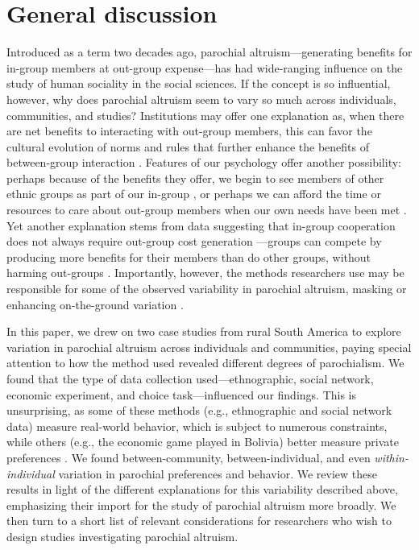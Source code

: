 \documentclass[bibauthoryear]{aa}
\begin{document}
\section{General discussion}
Introduced as a term two decades ago, parochial altruism---generating benefits for in-group members at out-group expense---has had wide-ranging influence on the study of human sociality in the social sciences. If the concept is so influential, however, why does parochial altruism seem to vary so much across individuals, communities, and studies? Institutions may offer one explanation as, when there are net benefits to interacting with out-group members, this can favor the cultural evolution of norms and rules that further enhance the benefits of between-group interaction \citep{fearon1996explaining, fry2018evolutionary, pisor2019evolution}. Features of our psychology offer another possibility: perhaps because of the benefits they offer, we begin to see members of other ethnic groups as part of our in-group \citep{brewer1976ethnocentrism, beck2006cosmopolitan, buchan2009globalization, fukuyama2001social, hruschka2013economic, mau2008cosmopolitan, singer2011expanding}, or perhaps we can afford the time or resources to care about out-group members when our own needs have been met \citep{hruschka2014impartial, silva2014cooperation}. Yet another explanation stems from data suggesting that in-group cooperation does not always require out-group cost generation \citep{purzycki2019identity, hruschka2013economic, yamagishi2016parochial, brewer2006evolutionary, schaub2017threat, cashdan2001ethnocentrism, Rusch2014}---groups can compete by producing more benefits for their members than do other groups, without harming out-groups \citep{waring2015}. Importantly, however, the methods researchers use may be responsible for some of the observed variability in parochial altruism, masking or enhancing on-the-ground variation \citep{Pisor2020}.

In this paper, we drew on two case studies from rural South America to explore variation in parochial altruism across individuals and communities, paying special attention to how the method used revealed different degrees of parochialism. We found that the type of data collection used---ethnographic, social network, economic experiment, and choice task---influenced our findings. This is unsurprising, as some of these methods (e.g., ethnographic and social network data) measure real-world behavior, which is subject to numerous constraints, while others (e.g., the economic game played in Bolivia) better measure private preferences \citep{Pisor2020}. We found between-community, between-individual, and even \emph{within-individual} variation in parochial preferences and behavior. We review these results in light of the different explanations for this variability described above, emphasizing their import for the study of parochial altruism more broadly. We then turn to a short list of relevant considerations for researchers who wish to design studies investigating parochial altruism.
\end{document}
